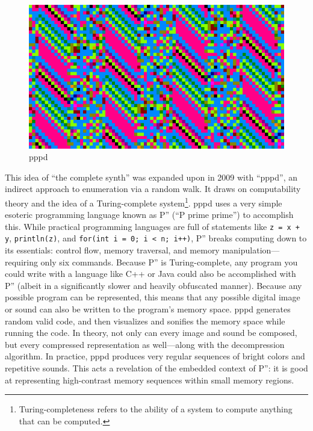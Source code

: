\documentclass{thesis}
\begin{document}
\begin{figure}
	\begin{center}
		\includegraphics[scale=.5]{graphics/pppd.png}
		\caption{pppd}
	\end{center}
\end{figure}

This idea of ``the complete synth'' was expanded upon in 2009 with ``pppd''\cite{kyle_mcdonald_pppd_2009}, an indirect approach to enumeration via a random walk. It draws on computability theory\cite{boolos_computability_2002} and the idea of a Turing-complete system\footnote{Turing-completeness refers to the ability of a system to compute anything that can be computed.}. pppd uses a very simple esoteric programming language known as P'' (``P prime prime'') to accomplish this. While practical programming languages are full of statements like \verb!z = x + y!, \verb!println(z)!, and \verb!for(int i = 0; i < n; i++)!, P'' breaks computing down to its essentials: control flow, memory traversal, and memory manipulation---requiring only six commands. Because P'' is Turing-complete, any program you could write with a language like C++ or Java could also be accomplished with P'' (albeit in a significantly slower and heavily obfuscated manner). Because any possible program can be represented, this means that any possible digital image or sound can also be written to the program's memory space. pppd generates random valid code, and then visualizes and sonifies the memory space while running the code. In theory, not only can every image and sound be composed, but every compressed representation as well---along with the decompression algorithm. In practice, pppd produces very regular sequences of bright colors and repetitive sounds. This acts a revelation of the embedded context of P'': it is good at representing high-contrast memory sequences within small memory regions.
\end{document}
